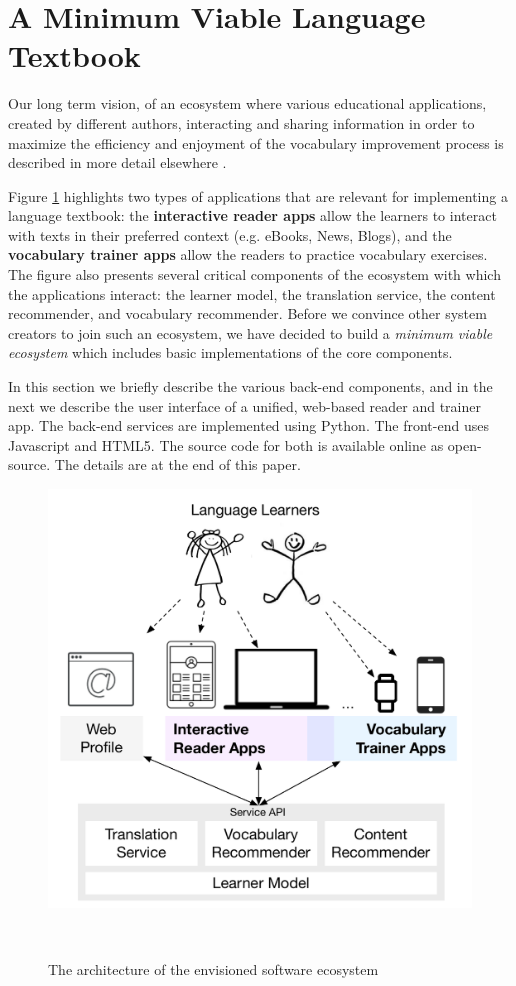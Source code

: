 
\section{A Minimum Viable Language Textbook}
\label{sec:system}

Our long term vision, of an ecosystem where various educational applications, created by different authors, interacting and sharing information in order to maximize the efficiency and enjoyment of the vocabulary improvement process is described in more detail elsewhere \cite{Lungu16}. 

Figure \ref{fig:architecture} highlights two types of applications that are relevant for implementing a language textbook: the {\bf interactive reader apps} allow the learners to interact with texts in their preferred context (e.g. eBooks, News, Blogs), and the {\bf vocabulary trainer apps} allow the readers to practice vocabulary exercises. 
% 
The figure also presents several critical components of the ecosystem with which the applications interact: the learner model, the translation service, the content recommender, and vocabulary recommender. Before we convince other system creators to join such an ecosystem, we have decided to build a {\em minimum viable ecosystem} which includes basic implementations of the core components. 

In this section we briefly describe the various back-end components, and in the next we describe the user interface of a unified, web-based reader and trainer app. The back-end services are implemented using Python. The front-end uses Javascript and HTML5. The source code for both is available online as open-source. The details are at the end of this paper.

\begin{figure}[h!]
\centering
  \includegraphics[width=0.65\columnwidth]{figures/zeeguu-architecture.pdf}
  \caption{The architecture of the envisioned software ecosystem}~\label{fig:architecture}
\end{figure}


